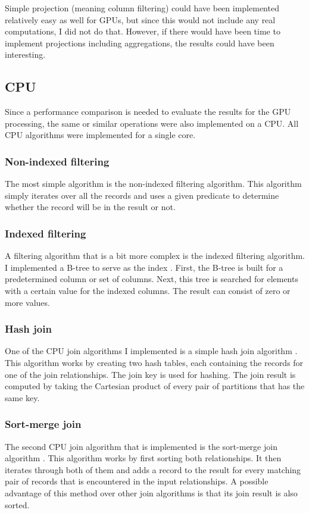 \documentclass[a4paper,titlepage]{article}
\begin{document}
Simple projection (meaning column filtering) could have been implemented relatively easy as well for GPUs, but since this would not include any real computations, I did not do that. However, if there would have been time to implement projections including aggregations, the results could have been interesting.

\subsection{CPU}
\label{sec:cpu-implementation}
Since a performance comparison is needed to evaluate the results for the GPU processing, the same or similar operations were also implemented on a CPU. All CPU algorithms were implemented for a single core.

\subsubsection{Non-indexed filtering}
The most simple algorithm is the non-indexed filtering algorithm. This algorithm simply iterates over all the records and uses a given predicate to determine whether the record will be in the result or not.

\subsubsection{Indexed filtering}
A filtering algorithm that is a bit more complex is the indexed filtering algorithm. I implemented a B-tree to serve as the index \cite{comer1979}. First, the B-tree is built for a predetermined column or set of columns. Next, this tree is searched for elements with a certain value for the indexed columns. The result can consist of zero or more values.

\subsubsection{Hash join}
One of the CPU join algorithms I implemented is a simple hash join algorithm \cite{dewitt1985}. This algorithm works by creating two hash tables, each containing the records for one of the join relationships. The join key is used for hashing. The join result is computed by taking the Cartesian product of every pair of partitions that has the same key.

\subsubsection{Sort-merge join}
The second CPU join algorithm that is implemented is the sort-merge join algorithm \cite{blasgen1977}. This algorithm works by first sorting both relationships. It then iterates through both of them and adds a record to the result for every matching pair of records that is encountered in the input relationships. A possible advantage of this method over other join algorithms is that its join result is also sorted.
\end{document}
